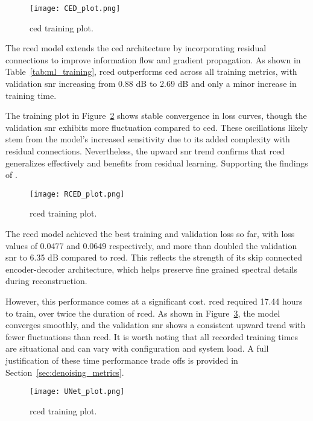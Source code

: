 \begin{figure}[H]
    \centering
    \texttt{[image: CED\_plot.png]}
    \caption{\label{fig:ced_training_plot} \gls{ced} training plot.}
\end{figure}

The \gls{rced} model extends the \gls{ced} architecture by incorporating residual connections to improve information flow and gradient propagation. As shown in Table~\ref{tab:ml_training}, \gls{rced} outperforms \gls{ced} across all training metrics, with validation \gls{snr} increasing from 0.88 dB to 2.69 dB and only a minor increase in training time.

The training plot in Figure~\ref{fig:rced_training_plot} shows stable convergence in loss curves, though the validation \gls{snr} exhibits more fluctuation compared to \gls{ced}. These oscillations likely stem from the model’s increased sensitivity due to its added complexity with residual connections. Nevertheless, the upward \gls{snr} trend confirms that \gls{rced} generalizes effectively and benefits from residual learning. Supporting the findings of \cite{park2017acoustic}.

\begin{figure}[H]
    \centering
    \texttt{[image: RCED\_plot.png]}
    \caption{\label{fig:rced_training_plot} \gls{rced} training plot.}
\end{figure}

The \gls{rced} model achieved the best training and validation loss so far, with loss values of 0.0477 and 0.0649 respectively, and more than doubled the validation \gls{snr} to 6.35 dB compared to \gls{rced}. This reflects the strength of its skip connected encoder-decoder architecture, which helps preserve fine grained spectral details during reconstruction.

However, this performance comes at a significant cost. \gls{rced} required 17.44 hours to train, over twice the duration of \gls{rced}. As shown in Figure~\ref{fig:unet_training_plot}, the model converges smoothly, and the validation \gls{snr} shows a consistent upward trend with fewer fluctuations than \gls{rced}. It is worth noting that all recorded training times are situational and can vary with configuration and system load. A full justification of these time performance trade offs is provided in Section~\ref{sec:denoising_metrics}.

\begin{figure}[H]
    \centering
    \texttt{[image: UNet\_plot.png]}
    \caption{\label{fig:unet_training_plot} \gls{rced} training plot.}
\end{figure}

